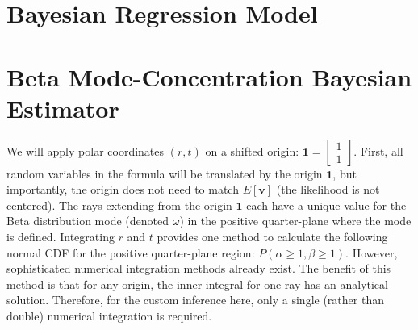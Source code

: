 \documentclass{article}
\begin{document}
\section*{Bayesian Regression Model}

\section*{Beta Mode-Concentration Bayesian Estimator}

We will apply polar coordinates $(r,t)$ on a shifted origin:
$\mathbf{1}=\left[\begin{matrix}1\\1\end{matrix}\right]$.
First, all random variables in the formula will be translated by the origin
$\mathbf{1}$, but importantly, the origin does not need to match
$E[\mathbf{v}]$ (the likelihood is not centered).
The rays extending from the origin $\mathbf{1}$ each have a unique value for the Beta
distribution mode (denoted $\omega$) in the positive quarter-plane where the
mode is defined.
Integrating $r$ and $t$ provides one method to calculate the following normal
CDF for the positive quarter-plane region: $P(\alpha\ge 1, \beta\ge 1)$.
However, sophisticated numerical integration methods already exist.
The benefit of this method is that for any origin, the inner integral for one
ray has an analytical solution.
Therefore, for the custom inference here, only a single (rather than double)
numerical integration is required.
\end{document}

